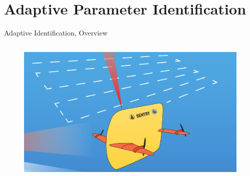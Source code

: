 \section{Adaptive Parameter Identification}

\begin{frame}[t]{Adaptive Identification, Overview}%

   \begin{columns}
      \begin{figure}[t!]
        \begin{center}
          \includegraphics[width=\textwidth]{./pres/images/justSentry}
        \end{center}
      \end{figure}


\end{columns}
\end{frame}
